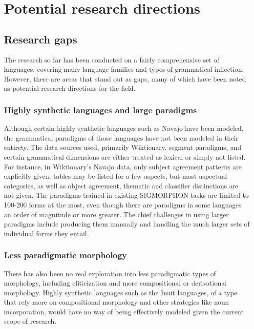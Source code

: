 \chapter{Potential research directions}

\section{Research gaps}

The research so far has been conducted on a fairly comprehensive set of languages, covering many language families and types of grammatical inflection. However, there are areas that stand out as gaps, many of which have been noted as potential research directions for the field. \\

\subsection{Highly synthetic languages and large paradigms}

Although certain highly synthetic languages such as Navajo have been modeled, the grammatical paradigms of those languages have not been modeled in their entirety. The data sources used, primarily Wiktionary, segment paradigms, and certain grammatical dimensions are either treated as lexical or simply not listed. For instance, in Wiktionary's Navajo data, only subject agreement patterns are explicitly given; tables may be listed for a few aspects, but most aspectual categories, as well as object agreement, thematic and classifier distinctions are not given. The paradigms trained in existing SIGMORPHON tasks are limited to 100-200 forms at the most, even though there are paradigms in some languages an order of magnitude or more greater. The chief challenges in using larger paradigms include producing them manually and handling the much larger sets of individual forms they entail. 

\subsection{Less paradigmatic morphology}

There has also been no real exploration into less paradigmatic types of morphology, including cliticization and more compositional or derivational morphology. Highly synthetic languages such as the Inuit languages, of a type that rely more on compositional morphology and other strategies like noun incorporation, would have no way of being effectively modeled given the current scope of research.

